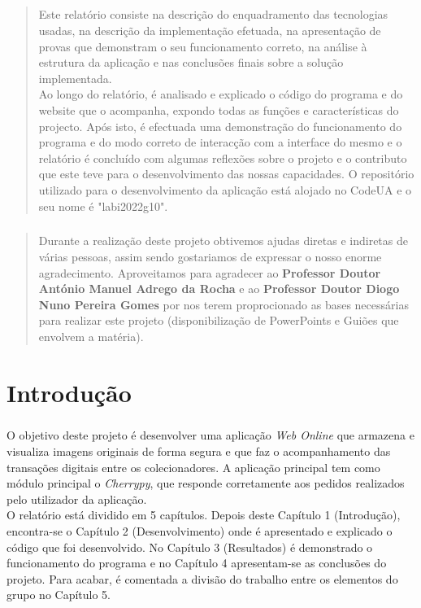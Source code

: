 \documentclass[a4paper, 11pt, oneside]{report}
\begin{document}
\begin{abstract}
\paragraph{} Este relatório consiste na descrição do enquadramento das tecnologias usadas, na descrição da implementação efetuada, na apresentação de provas que demonstram o seu funcionamento correto, na análise à estrutura da aplicação e nas conclusões finais sobre a solução implementada.\\
\indent Ao longo do relatório, é analisado e explicado o código do programa e do
website que o acompanha, expondo todas as funções e características do projecto.
Após isto, é efectuada uma demonstração do funcionamento do programa
e do modo correto de interacção com a interface do mesmo e o relatório é concluído
com algumas reflexões sobre o projeto e o contributo que este teve para
o desenvolvimento das nossas capacidades. O repositório utilizado para o desenvolvimento da aplicação está alojado no CodeUA e o seu nome é "labi2022g10".
\end{abstract}

\renewcommand{\abstractname}{Agradecimentos}
\begin{abstract}
\paragraph{} Durante a realização deste projeto obtivemos ajudas diretas e indiretas de várias pessoas, assim sendo gostariamos de expressar o nosso enorme agradecimento. Aproveitamos para agradecer ao \textbf{Professor Doutor António Manuel Adrego da Rocha} e ao \textbf{Professor Doutor Diogo Nuno Pereira Gomes}  por nos terem proprocionado as bases necessárias para realizar este projeto (disponibilização de PowerPoints e Guiões que envolvem a matéria).
\end{abstract}

\tableofcontents
\clearpage
{}

\chapter{Introdução}

\paragraph{} O objetivo deste projeto é desenvolver uma aplicação \textit{Web Online} que armazena e visualiza imagens originais de forma segura e que faz o acompanhamento das transações digitais entre os colecionadores. A aplicação principal tem como módulo principal o \textit{Cherrypy}, que responde corretamente aos pedidos realizados pelo utilizador da aplicação.\\
\indent O relatório está dividido em 5 capítulos. Depois deste Capítulo 1 (Introdução), encontra-se o Capítulo 2 (Desenvolvimento) onde é apresentado e explicado o código que foi desenvolvido. No Capítulo 3 (Resultados) é demonstrado o funcionamento do programa e no Capítulo 4 apresentam-se as conclusões do projeto. Para acabar, é comentada a divisão do trabalho entre os elementos do grupo no Capítulo 5.
\end{document}
